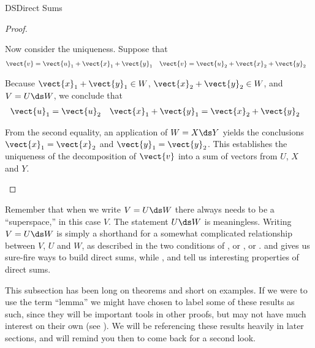 \begin{subsect}{DS}{Direct Sums}
\begin{proof}
%
\begin{para}Now consider the uniqueness.  Suppose that
%
\begin{align*}
\vect{v}&=\vect{u}_1+\vect{x}_1+\vect{y}_1
&
\vect{v}&=\vect{u}_2+\vect{x}_2+\vect{y}_2
\end{align*}\end{para}
%
\begin{para}Because $\vect{x}_1+\vect{y}_1\in W$, $\vect{x}_2+\vect{y}_2\in W$, and $V=U\ds W$, we conclude that
%
\begin{align*}
\vect{u}_1&=\vect{u}_2
&
\vect{x}_1+\vect{y}_1&=\vect{x}_2+\vect{y}_2
\end{align*}\end{para}
%
\begin{para}From the second equality, an application of $W=X\ds Y$ yields the conclusions $\vect{x}_1=\vect{x}_2$ and $\vect{y}_1=\vect{y}_2$.  This establishes the uniqueness of the decomposition of $\vect{v}$ into a sum of vectors from $U$, $X$ and $Y$.\end{para}
%
\end{proof}
%
\begin{para}Remember that when we write $V=U\ds W$ there always needs to be a ``superspace,'' in this case $V$.  The statement $U\ds W$ is meaningless.  Writing $V=U\ds W$ is simply a shorthand for a somewhat complicated relationship between $V$, $U$ and $W$, as described in the two conditions of , or , or .   and  gives us sure-fire ways to build direct sums, while ,   and  tell us interesting properties of direct sums.\end{para}
%
\begin{para}This subsection has been long on theorems and short on examples.  If we were to use the term ``lemma'' we might have chosen to label some of these results as such, since they will be important tools in other proofs, but may not have much interest on their own (see ).  We will be referencing these results heavily in later sections, and will remind you then to come back for a second look.\end{para}
%
\end{subsect}
%

